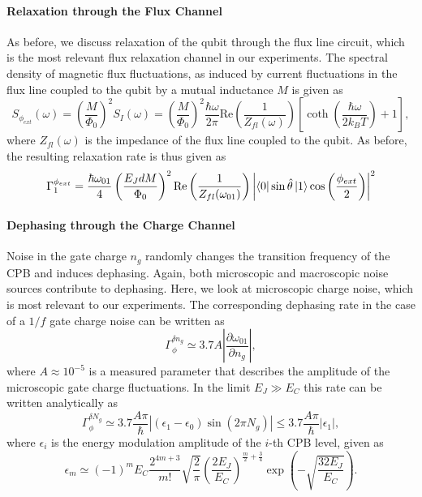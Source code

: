 \paragraph{Relaxation through the Flux Channel}

As before, we discuss relaxation of the qubit through the flux line circuit, which is the most relevant flux relaxation channel in our experiments. The spectral density of magnetic flux fluctuations, as induced by current fluctuations in the flux line coupled to the qubit by a mutual inductance $M$ is given as
%
\begin{equation}
S_{\phi_{ext}}(\omega) = \left(\frac{M}{\Phi_0}\right)^2 S_I(\omega) = \left(\frac{M}{\Phi_0}\right)^2\frac{\hbar\omega}{2\pi}\mathrm{Re}\left(\frac{1}{Z_{fl}(\omega)}\right)\left[\coth{\left(\frac{\hbar\omega}{2k_B T}\right)}+1\right],
\end{equation}
%
where $Z_{fl}(\omega)$ is the impedance of the flux line coupled to the qubit. As before, the resulting relaxation rate is thus given as
%
\begin{equation}
\Gamma_1^{\phi_{ext}} = \frac{\hbar\omega_{01}}{4}\left(\frac{E_J d M}{\Phi_0}\right)^2 \mathrm{Re}\left(\frac{1}{Z_{fl}(\omega_{01})}\right)\left|\left< 0 \right|\sin{\hat{\theta}}\left| 1 \right>\cos{\left(\frac{\phi_{ext}}{2}\right)}\right|^2 \label{eq:flux_relaxation_rate}
\end{equation}
%

\paragraph{Dephasing through the Charge Channel}

Noise in the gate charge $n_g$ randomly changes the transition frequency of the CPB and induces dephasing. Again, both microscopic and macroscopic noise sources contribute to dephasing. Here, we look at microscopic charge noise, which is most relevant to our experiments. The corresponding dephasing rate in the case of a $1/f$ gate charge noise can be written as \citep{cottet_implementation_2002,van_harlingen_decoherence_2004}
%
\begin{equation}
\Gamma_\phi^{\delta n_g} \simeq 3.7A \left|\frac{\partial \omega_{01}}{\partial n_g}\right|,
\end{equation}
%
where $A\approx 10^{-5}$ is a measured parameter that describes the amplitude of the microscopic gate charge fluctuations. In the limit $E_J\gg E_C$ this rate can be written analytically as
%
\begin{equation}
\Gamma_\phi^{\delta N_g} \simeq 3.7\frac{A\pi}{\hbar}\left| (\epsilon_1-\epsilon_0)\sin{\left(2\pi N_g\right)}\right| \leq 3.7\frac{A\pi}{\hbar}|\epsilon_1|,
\end{equation}
%
where $\epsilon_i$ is the energy modulation amplitude of the $i$-th CPB level, given as \citep{koch_charge-insensitive_2007}
%
\begin{equation}
\epsilon_m\simeq (-1)^m E_C\frac{2^{4m+3}}{m!}\sqrt{\frac{2}{\pi}}\left(\frac{2E_J}{E_C}\right)^{\frac{m}{2}+\frac{3}{4}}\exp{\left(-\sqrt{\frac{32E_J}{E_C}}\right)}. \label{eq:charge_dephasing_rate}
\end{equation}
%

